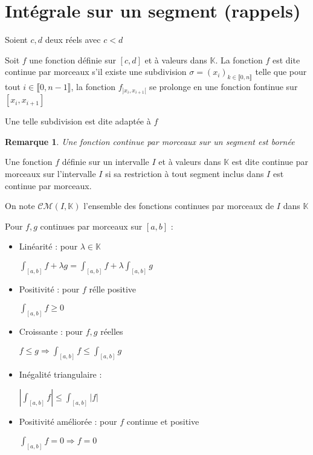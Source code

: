 \documentclass[a4paper,12pt]{book}
\newcommand{\Def}[2]{\begin{tcolorbox}[sharp corners, colback=white,colframe=blue!90!black!75, title=Définition : #1]#2\end{tcolorbox}}
\newcommand{\Prop}[2]{\begin{tcolorbox}[sharp corners, colback=white,colframe=red!90!black!75, title=Proposition : #1]#2\end{tcolorbox}}
\newtheorem{Rem}{Remarque}[section]
\def\K{\mathbb{K}}
\begin{document}
\section{Intégrale sur un segment (rappels)}
\Def{}{Soient $c,d$ deux réels avec $c<d$ \par Soit $f$ une fonction définie sur $[c,d]$ et à valeurs dans $\K$. La fonction $f$ est dite continue par morceaux s'il existe une subdivision $\sigma=(x_i)_{k\in\llbracket 0,n\rrbracket}$ telle que pour tout $i\in\llbracket 0,n-1\rrbracket$, la fonction $f_{]x_i,x_{i+1}[}$ se prolonge en une fonction fontinue sur $[x_i, x_{i+1}]$ \par Une telle subdivision est dite adaptée à $f$}
\begin{Rem}
Une fonction continue par morceaux sur un segment est bornée
\end{Rem}
\Def{}{Une fonction $f$ définie sur un intervalle $I$ et à valeurs dans $\K$ est dite continue par morceaux sur l'intervalle $I$ si sa restriction à tout segment inclus dans $I$ est continue par morceaux. \par On note $\mathcal{CM}(I, \K)$ l'ensemble des fonctions continues par morceaux de $I$ dans $\K$}
\Prop{}{Pour $f,g$ continues par morceaux sur $[a,b]$ : \begin{itemize}
\item Linéarité : pour $\lambda\in\K$ \par \begin{center}$\int_{[a,b]}f+\lambda g=\int_{[a,b]}f + \lambda \int_{[a,b]}g$ \end{center}
\item Positivité : pour $f$ rélle positive \par \begin{center} $\int_{[a,b]}f\geq 0$\end{center}
\item Croissante : pour $f,g$ réelles \par \begin{center}$f\leq g\Rightarrow \int_{[a,b]}f\leq\int_{[a,b]}g$\end{center}
\item Inégalité triangulaire : \par \begin{center} $\left\vert\int_{[a,b]}f\right\vert\leq\int_{[a,b]}\vert f\vert$\end{center}
\item Positivité améliorée : pour $f$ continue et positive \par \begin{center} $\int_{[a,b]}f=0\Rightarrow f=0$\end{center}
\end{itemize}}
\end{document}
